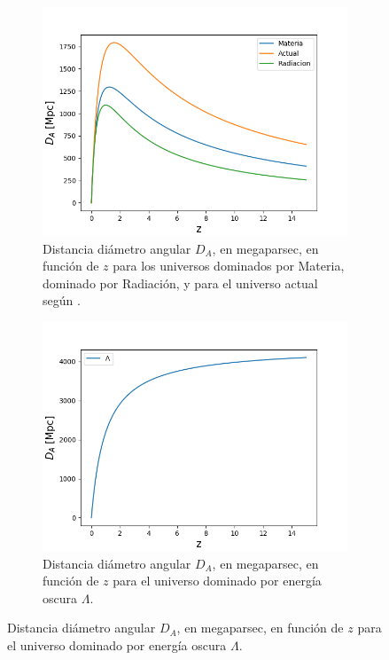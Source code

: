 \documentclass[twoside]{article}
\begin{document}
					\begin{figure}[H]
						\centering
						\begin{subfigure}{.5\textwidth}
							\centering
							\includegraphics[scale=0.5]{DistanDiamAngular.png}
							\caption{Distancia diámetro angular $D_A$, en megaparsec, en función de $z$ para los universos dominados por Materia, dominado por Radiación, y para el universo actual según \cite{Plank}.}
							\label{Img:DisAng-All}
						\end{subfigure}%
						\begin{subfigure}{.5\textwidth}
							\centering
							\includegraphics[scale=0.5]{DistanDiamAngular(EnrgOsc).png}
							\caption{Distancia diámetro angular $D_A$, en megaparsec, en función de $z$ para el universo dominado por energía oscura $\Lambda$.}

\end{subfigure}
\end{figure}
\end{document}
